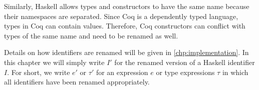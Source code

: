 Similarly, Haskell allows types and constructors to have the same name because their namespaces are separated.
Since Coq is a dependently typed language, types in Coq can contain values.
Therefore, Coq constructors can conflict with types of the same name and need to be renamed as well.

Details on how identifiers are renamed will be given in \autoref{chp:implementation}.
In this chapter we will simply write $I'$ for the renamed version of a Haskell identifier $I$.
For short, we write $e'$ or $\tau'$ for an expression $e$ or type expressions $\tau$ in which all identifiers have been renamed appropriately.
